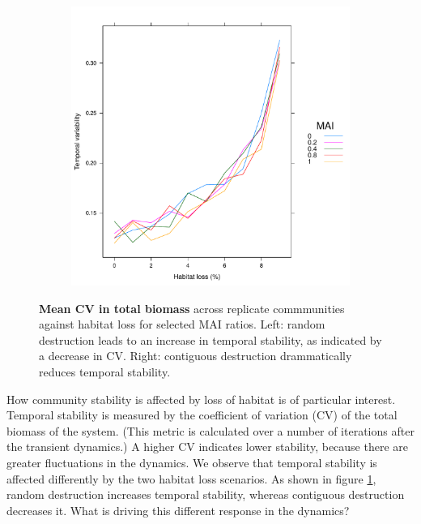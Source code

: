 \begin{figure}
\begin{subfigure}[b]{0.5\textwidth}
                \includegraphics[width=\textwidth]{"contiguous_plots/mean_cv"}
        \end{subfigure}
        \caption{\textbf{Mean CV in total biomass} across replicate commmunities against habitat loss for selected MAI ratios. Left: random destruction leads to an increase in temporal stability, as indicated by a decrease in CV. Right: contiguous destruction drammatically reduces temporal stability.}\label{fig:temporal_stability}
\end{figure}

How community stability is affected by loss of habitat is of particular interest. Temporal stability is measured by the coefficient of variation (CV) of the total biomass of the system. (This metric is calculated over a number of iterations after the transient dynamics.) A higher CV indicates lower stability, because there are greater fluctuations in the dynamics. We observe that temporal stability is affected differently by the two habitat loss scenarios. As shown in figure \ref{fig:temporal_stability}, random destruction increases temporal stability, whereas contiguous destruction decreases it. What is driving this different response in the dynamics?    

